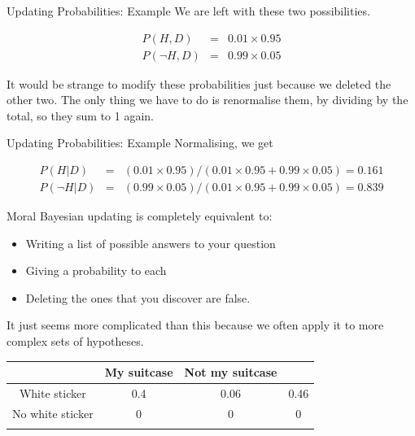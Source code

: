 \documentclass{beamer}
\begin{document}
\begin{frame}[t]{Updating Probabilities: Example}
We are left with these two possibilities.

\begin{eqnarray*}
P(H, D) &=& 0.01 \times 0.95\\
P(\neg H, D) &=& 0.99 \times 0.05
\end{eqnarray*}

It would be strange to modify these probabilities just because we deleted the
other two. The only thing we have to do is renormalise them, by dividing by the total, so they sum to 1 again.
\end{frame}

\begin{frame}[t]{Updating Probabilities: Example}
Normalising, we get

\begin{eqnarray*}
P(H | D) &=& (0.01 \times 0.95)/(0.01 \times 0.95 + 0.99\times0.05) = 0.161\\
P(\neg H | D) &=& (0.99 \times 0.05)/(0.01 \times 0.95 + 0.99\times0.05) = 0.839
\end{eqnarray*}
\end{frame}

\begin{frame}[t]{Moral}
Bayesian updating is completely equivalent to:
\begin{itemize}
\item Writing a list of possible answers to your question
\item Giving a probability to each
\item Deleting the ones that you discover are false.
\end{itemize}

It just seems more complicated than this because we often apply it to more
complex sets of hypotheses.
\end{frame}


\begin{frame}[t]{}


\begin{table}[ht]
\centering
\begin{tabular}{c|cc|c}
			&		My suitcase		&		Not my suitcase	&\\
\hline
\rowcolor{LightCyan}
White sticker		&		0.4			&		0.06	& 0.46\\
\rowcolor{DarkGray}
No white sticker	&		0			&		0	& 0\\
\hline
			&				&		\\
\end{tabular}
\end{table}
\end{frame}
\end{document}
